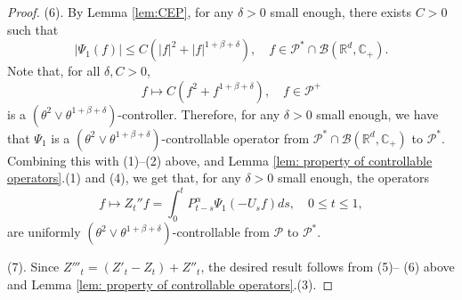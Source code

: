 \documentclass[12pt,a4paper]{amsart}
\theoremstyle{plain}
\theoremstyle{definition}
\numberwithin{equation}{section}
\begin{document}
\begin{proof}
  (6). By  Lemma \ref{lem:CEP}, for any $\delta > 0$ small enough, there exists  $C>0$ such that
  \[
    |\Psi_1(f)|
    \le C(|f|^2+|f|^{1+\beta+ \delta})
    , \quad f\in \mathcal P^*\cap\mathcal B(\mathbb R^d, \mathbb C_+).
  \]
  Note that, for all $\delta, C>0$,
  \[
    f \mapsto C(f^2+f^{1+\beta+\delta})
    , \quad f\in \mathcal P^+
  \]
  is a $(\theta^2 \vee \theta^{1+\beta+\delta})$-controller.
  Therefore, for any $\delta > 0$ small enough, we have that $\Psi_1$ is a $(\theta^2 \vee \theta^{1+\beta+\delta})$-controllable operator from $\mathcal P^*\cap\mathcal B(\mathbb R^d, \mathbb C_+)$ to $\mathcal P^*$.
  Combining  this with  (1)--(2) above,
  and Lemma \ref{lem: property of controllable operators}.(1) and (4), we get that, for any $\delta > 0$ small enough, the operators
  \[
    f
    \mapsto Z_t'' f
    = \int_0^t P_{t-s}^\alpha \Psi_1(-U_sf)ds
    , \quad 0\leq t\leq 1,
  \]
  are uniformly $(\theta^2 \vee \theta^{1+\beta+\delta})$-controllable from $\mathcal P$ to $\mathcal P^*$.

  (7). Since $Z'''_t = (Z'_t-Z_t)+Z''_t$, the desired result follows from (5)-- (6) above and Lemma \ref{lem: property of controllable operators}.(3).
\end{proof}

\end{document}
